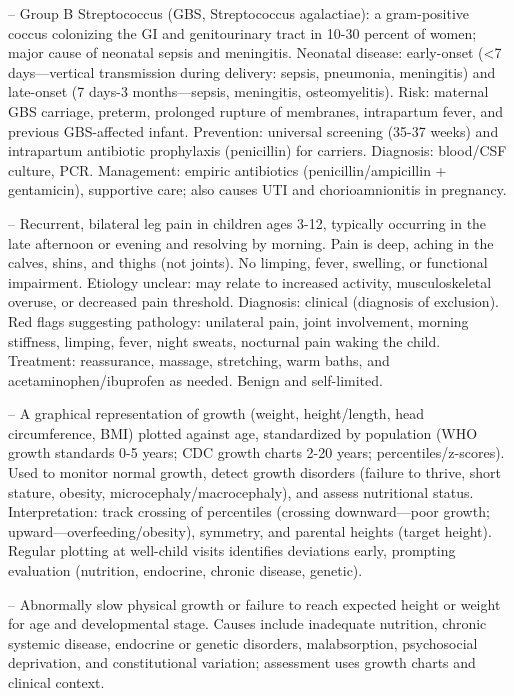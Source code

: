 -- Group B Streptococcus (GBS, Streptococcus agalactiae): a gram-positive coccus colonizing the GI and genitourinary tract in 10-30 percent of women; major cause of neonatal sepsis and meningitis. Neonatal disease: early-onset (<7 days—vertical transmission during delivery: sepsis, pneumonia, meningitis) and late-onset (7 days-3 months—sepsis, meningitis, osteomyelitis). Risk: maternal GBS carriage, preterm, prolonged rupture of membranes, intrapartum fever, and previous GBS-affected infant. Prevention: universal screening (35-37 weeks) and intrapartum antibiotic prophylaxis (penicillin) for carriers. Diagnosis: blood/CSF culture, PCR. Management: empiric antibiotics (penicillin/ampicillin + gentamicin), supportive care; also causes UTI and chorioamnionitis in pregnancy.

-- Recurrent, bilateral leg pain in children ages 3-12, typically occurring in the late afternoon or evening and resolving by morning. Pain is deep, aching in the calves, shins, and thighs (not joints). No limping, fever, swelling, or functional impairment. Etiology unclear: may relate to increased activity, musculoskeletal overuse, or decreased pain threshold. Diagnosis: clinical (diagnosis of exclusion). Red flags suggesting pathology: unilateral pain, joint involvement, morning stiffness, limping, fever, night sweats, nocturnal pain waking the child. Treatment: reassurance, massage, stretching, warm baths, and acetaminophen/ibuprofen as needed. Benign and self-limited.

-- A graphical representation of growth (weight, height/length, head circumference, BMI) plotted against age, standardized by population (WHO growth standards 0-5 years; CDC growth charts 2-20 years; percentiles/z-scores). Used to monitor normal growth, detect growth disorders (failure to thrive, short stature, obesity, microcephaly/macrocephaly), and assess nutritional status. Interpretation: track crossing of percentiles (crossing downward—poor growth; upward—overfeeding/obesity), symmetry, and parental heights (target height). Regular plotting at well-child visits identifies deviations early, prompting evaluation (nutrition, endocrine, chronic disease, genetic).

-- Abnormally slow physical growth or failure to reach expected height or weight for age and developmental stage. Causes include inadequate nutrition, chronic systemic disease, endocrine or genetic disorders, malabsorption, psychosocial deprivation, and constitutional variation; assessment uses growth charts and clinical context.

